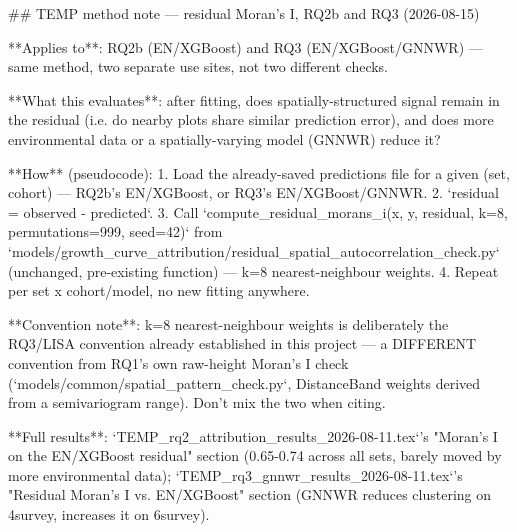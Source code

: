 ## TEMP method note — residual Moran's I, RQ2b and RQ3 (2026-08-15)

**Applies to**: RQ2b (EN/XGBoost) and RQ3 (EN/XGBoost/GNNWR) — same method, two separate use sites,
not two different checks.

**What this evaluates**: after fitting, does spatially-structured signal remain in the residual
(i.e. do nearby plots share similar prediction error), and does more environmental data or a
spatially-varying model (GNNWR) reduce it?

**How** (pseudocode):
1. Load the already-saved predictions file for a given (set, cohort) — RQ2b's EN/XGBoost, or
   RQ3's EN/XGBoost/GNNWR.
2. `residual = observed - predicted`.
3. Call `compute_residual_morans_i(x, y, residual, k=8, permutations=999, seed=42)` from
   `models/growth_curve_attribution/residual_spatial_autocorrelation_check.py` (unchanged,
   pre-existing function) — k=8 nearest-neighbour weights.
4. Repeat per set x cohort/model, no new fitting anywhere.

**Convention note**: k=8 nearest-neighbour weights is deliberately the RQ3/LISA convention already
established in this project — a DIFFERENT convention from RQ1's own raw-height Moran's I check
(`models/common/spatial_pattern_check.py`, DistanceBand weights derived from a semivariogram
range). Don't mix the two when citing.

**Full results**: `TEMP_rq2_attribution_results_2026-08-11.tex`'s "Moran's I on the EN/XGBoost
residual" section (0.65-0.74 across all sets, barely moved by more environmental data);
`TEMP_rq3_gnnwr_results_2026-08-11.tex`'s "Residual Moran's I vs. EN/XGBoost" section (GNNWR
reduces clustering on 4survey, increases it on 6survey).
